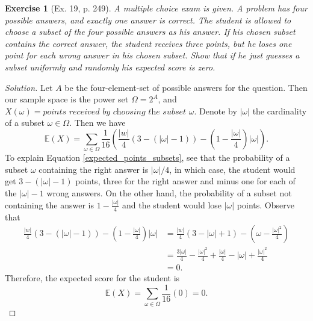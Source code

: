 \documentclass[letterpaper, 10 pt, conference]{article}
\newtheorem{ex}{Exercise}
\newcommand\E{\ensuremath{\mathbb{E}}}
\newcommand\Om{\ensuremath{\Omega}}
\newcommand{\w}{\ensuremath{\omega}}
\begin{document}
\begin{ex}[Ex. 19, p. 249]
	A multiple choice exam is given. A problem has four possible answers, and exactly one answer is correct. The student is allowed to choose a subset of the four possible answers as his answer. If his chosen subset contains the correct answer, the student receives three points, but he loses one point for each wrong answer in his chosen subset. Show that if he just guesses a subset uniformly and randomly his expected score is zero. 
\end{ex}
\begin{proof}[Solution]
Let $A$ be the four-element-set of possible answers for the question. Then our sample space is the power set $\Om = 2^A$, and $X(\w) = \textit{points received by choosing the subset } \w$. Denote by $|\w|$ the cardinality of a subset $\w \in \Om$. Then we have 
\begin{equation}\label{expected_points_subsets}
	\E(X) = \sum_{\w \in \Om} \frac{1}{16} \left( \frac{|w|}{4} \left(3 - (|\w| - 1)\right) - \left(1-\frac{|\w|}{4}\right) |\w| \right).
\end{equation}
To explain Equation \ref{expected_points_subsets}, see that the probability of a subset $\w$ containing the right answer is $|\w| / 4$, in which case, the student would get $3-(|\w| -1)$ points, three for the right answer and minus one for each of the $|\w| - 1$ wrong answers. On the other hand, the probability of a subset not containing the answer is $1-\frac{|\w|}{4}$ and the student would lose $|\w|$ points.  Observe that 
\begin{align}
 \frac{|w|}{4} \left(3 - (|\w| - 1)\right) - \left(1-\frac{|\w|}{4}\right) |\w| &=  \frac{|w|}{4}  \left(3 - |\w| + 1\right) - \left(\w - \frac{|\w|^2}{4}\right)\\
 &= \frac{3 |\w|}{4} - \frac{|\w|^2}{4} + \frac{|\w|}{4} - |\w| + \frac{|\w|^2}{4}\\
 &= 0.
\end{align}
Therefore, the expected score for the student is 
\begin{equation}
	\E(X) = \sum_{\w \in \Om} \frac{1}{16} (0) = 0.
\end{equation}
\end{proof}
\end{document}

